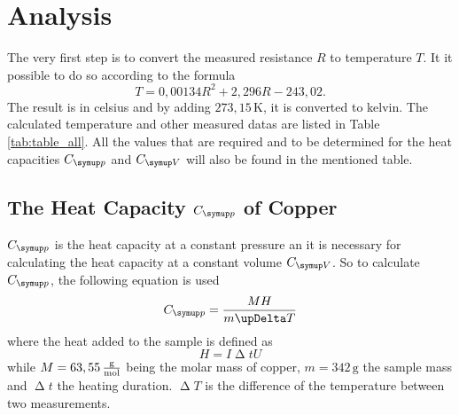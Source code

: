\newpage
\section{Analysis}
The very first step is to convert the measured resistance $R$ to temperature $T$. It it possible to do so according
to the formula
\begin{equation}
    T = 0,00134R^2 + 2,296R - 243,02 .
\end{equation}
The result is in celsius and by adding $273,15\,\unit{\kelvin}$, it is converted to kelvin.
The calculated temperature and other measured datas are listed in Table \ref{tab:table_all}. All the values that are required 
and to be determined for the heat capacities $C\idx{p}$ and $C\idx{V}$ will also be found in the mentioned table.

\subsection{The Heat Capacity $C\idx{p}$ of Copper}

$C\idx{p}$ is the heat capacity at a constant pressure an it is necessary for calculating 
the heat capacity at a constant volume $C\idx{V}$. So to calculate $C\idx{p}$, the following equation
is used
\begin{equation}
    C\idx{p} = \frac{MH}{m \upDelta T}
\end{equation}
where the heat added to the sample is defined as
\begin{equation}
    H= I \upDelta t U
\end{equation}
while $M = 63,55\,\unit{\frac{\gram}{\mole}}$\cite{lenntech} being the molar mass of copper, $m= 342\,\unit{\gram}$ \cite{V47}
the sample mass and $\upDelta t$ the heating duration. $\upDelta T$ is the difference of the temperature between 
two measurements.



